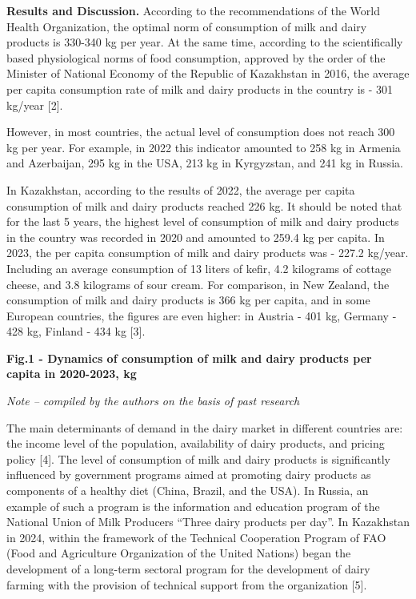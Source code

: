 {\bfseries Results and Discussion.} According to the recommendations of the
World Health Organization, the optimal norm of consumption of milk and
dairy products is 330-340 kg per year. At the same time, according to
the scientifically based physiological norms of food consumption,
approved by the order of the Minister of National Economy of the
Republic of Kazakhstan in 2016, the average per capita consumption rate
of milk and dairy products in the country is - 301 kg/year {[}2{]}.

However, in most countries, the actual level of consumption does not
reach 300 kg per year. For example, in 2022 this indicator amounted to
258 kg in Armenia and Azerbaijan, 295 kg in the USA, 213 kg in
Kyrgyzstan, and 241 kg in Russia.

In Kazakhstan, according to the results of 2022, the average per capita
consumption of milk and dairy products reached 226 kg. It should be
noted that for the last 5 years, the highest level of consumption of
milk and dairy products in the country was recorded in 2020 and amounted
to 259.4 kg per capita. In 2023, the per capita consumption of milk and
dairy products was - 227.2 kg/year. Including an average consumption of
13 liters of kefir, 4.2 kilograms of cottage cheese, and 3.8 kilograms
of sour cream. For comparison, in New Zealand, the consumption of milk
and dairy products is 366 kg per capita, and in some European countries,
the figures are even higher: in Austria - 401 kg, Germany - 428 kg,
Finland - 434 kg {[}3{]}.

{\bfseries Fig.1 - Dynamics of consumption of milk and dairy products per
capita in 2020-2023, kg}

\emph{Note -- compiled by the authors on the basis of past research}

The main determinants of demand in the dairy market in different
countries are: the income level of the population, availability of dairy
products, and pricing policy {[}4{]}. The level of consumption of milk
and dairy products is significantly influenced by government programs
aimed at promoting dairy products as components of a healthy diet
(China, Brazil, and the USA). In Russia, an example of such a program is
the information and education program of the National Union of Milk
Producers ``Three dairy products per day''. In Kazakhstan in 2024,
within the framework of the Technical Cooperation Program of FAO (Food
and Agriculture Organization of the United Nations) began the
development of a long-term sectoral program for the development of dairy
farming with the provision of technical support from the organization
{[}5{]}.

